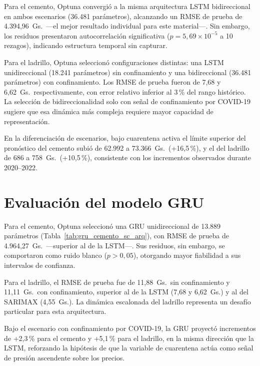 \justify
Para el cemento, Optuna convergió a la misma arquitectura LSTM bidireccional en ambos escenarios (36.481 parámetros), alcanzando un RMSE de prueba de 4.394{,}96~Gs.\ ---el mejor resultado individual para este material---. Sin embargo, los residuos presentaron autocorrelación significativa ($p=5{,}69 \times 10^{-5}$ a 10 rezagos), indicando estructura temporal sin capturar.

\justify
Para el ladrillo, Optuna seleccionó configuraciones distintas: una LSTM unidireccional (18.241 parámetros) sin confinamiento y una bidireccional (36.481 parámetros) con confinamiento. Los RMSE de prueba fueron de 7{,}68 y 6{,}62~Gs.\ respectivamente, con error relativo inferior al 3\,\% del rango histórico. La selección de bidireccionalidad solo con señal de confinamiento por COVID-19 sugiere que esa dinámica más compleja requiere mayor capacidad de representación.

\justify
En la diferenciación de escenarios, bajo cuarentena activa el límite superior del pronóstico del cemento subió de 62.992 a 73.366~Gs.\ (+16{,}5\,\%), y el del ladrillo de 686 a 758~Gs.\ (+10{,}5\,\%), consistente con los incrementos observados durante 2020--2022.

\section{Evaluación del modelo GRU}

\justify
Para el cemento, Optuna seleccionó una GRU unidireccional de 13.889 parámetros (Tabla~\ref{tab:gru_cemento_sc_arq}), con RMSE de prueba de 4.964{,}27~Gs.\ ---superior al de la LSTM---. Sus residuos, sin embargo, se comportaron como ruido blanco ($p>0{,}05$), otorgando mayor fiabilidad a sus intervalos de confianza.

\justify
Para el ladrillo, el RMSE de prueba fue de 11{,}88~Gs.\ sin confinamiento y 11{,}11~Gs.\ con confinamiento, superior al de la LSTM (7{,}68 y 6{,}62~Gs.) y al del SARIMAX (4{,}55~Gs.). La dinámica escalonada del ladrillo representa un desafío particular para esta arquitectura.

\justify
Bajo el escenario con confinamiento por COVID-19, la GRU proyectó incrementos de +2{,}3\,\% para el cemento y +5{,}1\,\% para el ladrillo, en la misma dirección que la LSTM, reforzando la hipótesis de que la variable de cuarentena actúa como señal de presión ascendente sobre los precios.

